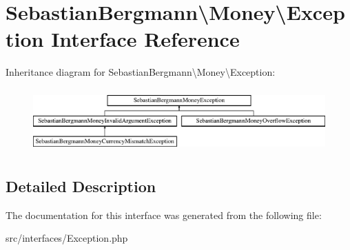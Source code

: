 \hypertarget{interfaceSebastianBergmann_1_1Money_1_1Exception}{}\section{Sebastian\+Bergmann\textbackslash{}Money\textbackslash{}Exception Interface Reference}
\label{interfaceSebastianBergmann_1_1Money_1_1Exception}
Inheritance diagram for Sebastian\+Bergmann\textbackslash{}Money\textbackslash{}Exception\+:\begin{figure}[H]
\begin{center}
\leavevmode
\includegraphics[height=2.463343cm]{interfaceSebastianBergmann_1_1Money_1_1Exception}
\end{center}
\end{figure}


\subsection{Detailed Description}


The documentation for this interface was generated from the following file\+:\begin{DoxyCompactItemize}
\item 
src/interfaces/Exception.\+php\end{DoxyCompactItemize}
